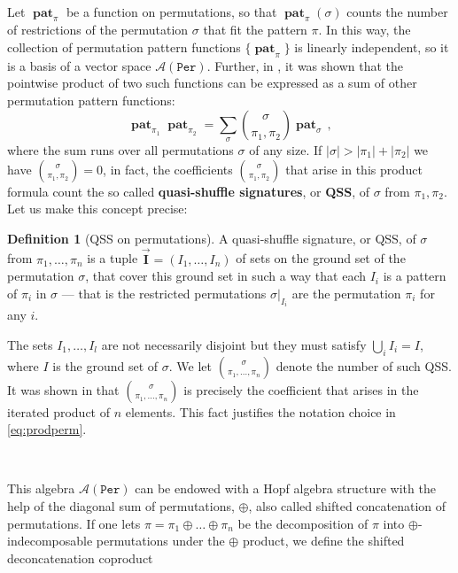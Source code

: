\documentclass[12pt, reqno]{amsart}
\theoremstyle{definition}
\newtheorem{defin}[thm]{Definition}
\newcommand{\III}{\vec{\mathbf{I}}}
\DeclareMathOperator{\pat}{\mathbf{pat}}
\begin{document}
\

Let $\pat_{\pi}$ be a function on permutations, so that $\pat_{\pi}(\sigma)$ counts the number of restrictions of the permutation $\sigma$ that fit the pattern $\pi$.
In this way, the collection of permutation pattern functions $\{\pat_{\pi}\}$ is linearly independent, so it is a basis of a vector space $\mathcal A (\mathtt{Per})$.
Further, in \cite{Vargas}, it was shown that the pointwise product of two such functions can be expressed as a sum of other permutation pattern functions:
\begin{equation}\label{eq:prodperm}
\pat_{\pi_1} \pat_{\pi_2} = \sum_{\sigma} \binom{\sigma}{\pi_1, \pi_2} \pat_{\sigma} \, ,
\end{equation}
where the sum runs over all permutations $\sigma$ of any size.
If $|\sigma| > |\pi_1| + |\pi_2|$ we have $\binom{\sigma}{\pi_1, \pi_2} = 0$, in fact, the coefficients $\binom{\sigma}{\pi_1, \pi_2}$ that arise in this product formula count the so called \textbf{quasi-shuffle signatures}, or \textbf{QSS}, of $\sigma$ from $\pi_1, \pi_2$.
Let us make this concept precise:

\begin{defin}[QSS on permutations]
A quasi-shuffle signature, or QSS, of $\sigma$ from $\pi_1, \dots, \pi_n$ is a tuple $\III = (I_1, \dots, I_n)$ of sets on the ground set of the permutation $\sigma$, that cover this ground set in such a way that each $I_i$ is a pattern of $\pi_i$ in $\sigma$ --- that is the restricted permutations $\sigma|_{I_i}$ are the permutation $\pi_i$ for any $i$.

The sets $I_1, \ldots, I_l$ are not necessarily disjoint but they must satisfy $\bigcup_i I_i = I$, where $I$ is the ground set of $\sigma $.
We let $\binom{\sigma}{\pi_1, \dots, \pi_n}$ denote the number of such QSS.
It was shown in \cite{Penaguiao2020} that $\binom{\sigma}{\pi_1, \dots, \pi_n}$ is precisely the coefficient that arises in the iterated product of $n$ elements.
This fact justifies the notation choice in \eqref{eq:prodperm}.

\end{defin}

\

This algebra $\mathcal A(\mathtt{Per})$ can be endowed with a Hopf algebra structure with the help of the diagonal sum of permutations, $\oplus$, also called shifted concatenation of permutations.
If one lets $\pi = \pi_1 \oplus \dots \oplus \pi_n$ be the decomposition of $\pi$ into $\oplus$-indecomposable permutations under the $\oplus$ product, we define the shifted deconcatenation coproduct
\end{document}
